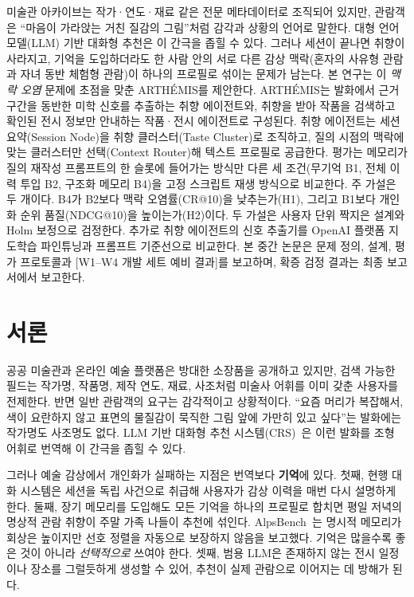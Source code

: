 \documentclass[10pt,twocolumn,letterpaper]{article}
\newcommand{\fillin}[1]{\textcolor{fillc}{[#1]}}
\begin{document}
\par\vspace{0.4em}
{\small\noindent
미술관 아카이브는 작가·연도·재료 같은 전문 메타데이터로 조직되어 있지만, 관람객은 ``마음이 가라앉는 거친 질감의 그림''처럼 감각과 상황의 언어로 말한다. 대형 언어 모델(LLM) 기반 대화형 추천은 이 간극을 좁힐 수 있다. 그러나 세션이 끝나면 취향이 사라지고, 기억을 도입하더라도 한 사람 안의 서로 다른 감상 맥락(혼자의 사유형 관람과 자녀 동반 체험형 관람)이 하나의 프로필로 섞이는 문제가 남는다. 본 연구는 이 \emph{맥락 오염} 문제에 초점을 맞춘 ARTHÉMIS를 제안한다. ARTHÉMIS는 발화에서 근거 구간을 동반한 미학 신호를 추출하는 취향 에이전트와, 취향을 받아 작품을 검색하고 확인된 전시 정보만 안내하는 작품·전시 에이전트로 구성된다. 취향 에이전트는 세션 요약(Session Node)을 취향 클러스터(Taste Cluster)로 조직하고, 질의 시점의 맥락에 맞는 클러스터만 선택(Context Router)해 텍스트 프로필로 공급한다. 평가는 메모리가 질의 재작성 프롬프트의 한 슬롯에 들어가는 방식만 다른 세 조건(무기억 B1, 전체 이력 투입 B2, 구조화 메모리 B4)을 고정 스크립트 재생 방식으로 비교한다. 주 가설은 두 개이다. B4가 B2보다 맥락 오염률(CR@10)을 낮추는가(H1), 그리고 B1보다 개인화 순위 품질(NDCG@10)을 높이는가(H2)이다. 두 가설은 사용자 단위 짝지은 설계와 Holm 보정으로 검정한다. 추가로 취향 에이전트의 신호 추출기를 OpenAI 플랫폼 지도학습 파인튜닝과 프롬프트 기준선으로 비교한다. 본 중간 논문은 문제 정의, 설계, 평가 프로토콜과 \fillin{W1–W4 개발 세트 예비 결과}를 보고하며, 확증 검정 결과는 최종 보고서에서 보고한다.\par}
\vspace{0.6em}

\section{서론}
\label{sec:intro}

공공 미술관과 온라인 예술 플랫폼은 방대한 소장품을 공개하고 있지만, 검색 가능한 필드는 작가명, 작품명, 제작 연도, 재료, 사조처럼 미술사 어휘를 이미 갖춘 사용자를 전제한다. 반면 일반 관람객의 요구는 감각적이고 상황적이다. ``요즘 머리가 복잡해서, 색이 요란하지 않고 표면의 물질감이 묵직한 그림 앞에 가만히 있고 싶다''는 발화에는 작가명도 사조명도 없다. LLM 기반 대화형 추천 시스템(CRS)~\cite{friedman2023recllm,jannach2021survey}은 이런 발화를 조형 어휘로 번역해 이 간극을 좁힐 수 있다.

그러나 예술 감상에서 개인화가 실패하는 지점은 번역보다 \textbf{기억}에 있다. 첫째, 현행 대화 시스템은 세션을 독립 사건으로 취급해 사용자가 감상 이력을 매번 다시 설명하게 한다. 둘째, 장기 메모리를 도입해도 모든 기억을 하나의 프로필로 합치면 평일 저녁의 명상적 관람 취향이 주말 가족 나들이 추천에 섞인다. AlpsBench~\cite{xiao2026alpsbench}는 명시적 메모리가 회상은 높이지만 선호 정렬을 자동으로 보장하지 않음을 보고했다. 기억은 많을수록 좋은 것이 아니라 \emph{선택적으로} 쓰여야 한다. 셋째, 범용 LLM은 존재하지 않는 전시 일정이나 장소를 그럴듯하게 생성할 수 있어, 추천이 실제 관람으로 이어지는 데 방해가 된다.
\end{document}
